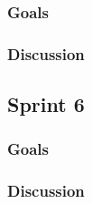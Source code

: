 \subsubsection{Goals}
\label{subsec:project_lifecycle-development-sprint_5-goals}

\subsubsection{Discussion}
\label{subsec:project_lifecycle-development-sprint_5-discussion}

\subsection{Sprint 6}
\label{subsec:project_lifecycle-development-sprint_6}

\subsubsection{Goals}
\label{subsec:project_lifecycle-development-sprint_6-goals}

\subsubsection{Discussion}
\label{subsec:project_lifecycle-development-sprint_6-discussion}

\clearpage